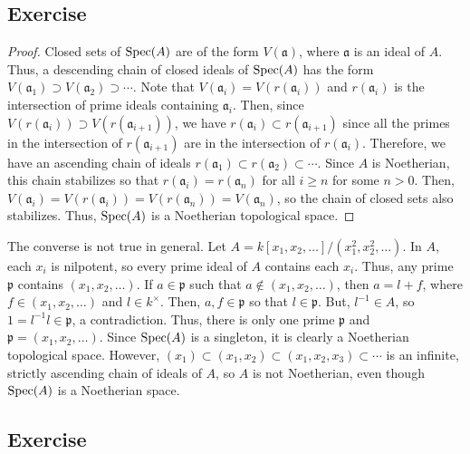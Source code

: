 \subsection{Exercise}\label{6.8}

\begin{proof}
Closed sets of $\operatorname{Spec}(A)$ are of the form $V(\mathfrak{a})$, where $\mathfrak{a}$ is an ideal of $A$. Thus, a descending chain of closed ideals of $\operatorname{Spec}(A)$
has the form $V(\mathfrak{a}_1) \supset V(\mathfrak{a}_2) \supset \cdots$. Note that $V(\mathfrak{a}_i) = V(r(\mathfrak{a}_i))$ and $r(\mathfrak{a}_i)$ is the
intersection of prime ideals containing $\mathfrak{a}_i$. Then, since $V(r(\mathfrak{a}_i)) \supset V(r(\mathfrak{a}_{i+1}))$, we have $r(\mathfrak{a}_i) \subset r(\mathfrak{a}_{i+1})$
since all the primes in the intersection of $r(\mathfrak{a}_{i+1})$ are in the intersection of $r(\mathfrak{a}_i)$. Therefore, we have an ascending chain
of ideals $r(\mathfrak{a}_1) \subset r(\mathfrak{a}_2) \subset \cdots$. Since $A$ is Noetherian, this chain stabilizes so that $r(\mathfrak{a}_i) = r(\mathfrak{a}_n)$
for all $i \ge n$ for some $n > 0$. Then, $V(\mathfrak{a}_i) = V(r(\mathfrak{a}_i)) = V(r(\mathfrak{a}_n)) = V(\mathfrak{a}_n)$, so the chain of closed sets also
stabilizes. Thus, $\operatorname{Spec}(A)$ is a Noetherian topological space.
\end{proof}

The converse is not true in general. Let $A = k[x_1,x_2,\ldots]/(x_1^2,x_2^2,\ldots)$. In $A$, each $x_i$ is nilpotent, so every prime ideal of $A$ contains each $x_i$.
Thus, any prime $\mathfrak{p}$ contains $(x_1,x_2,\ldots)$. If $a \in \mathfrak{p}$ such that $a \not\in (x_1,x_2,\ldots)$, then $a = l + f$, where $f \in (x_1,x_2,\ldots)$ 
and $l \in k^{\times}$. Then, $a,f \in \mathfrak{p}$ so that $l \in \mathfrak{p}$. But, $l^{-1} \in A$, so $1 = l^{-1}l \in \mathfrak{p}$, a contradiction. Thus,
there is only one prime $\mathfrak{p}$ and $\mathfrak{p} = (x_1,x_2,\ldots)$. Since $\operatorname{Spec}(A)$ is a singleton, it is clearly a Noetherian topological space.
However, $(x_1) \subset (x_1,x_2) \subset (x_1,x_2,x_3) \subset \cdots$ is an infinite, strictly ascending chain of ideals of $A$, so $A$ is not Noetherian,
even though $\operatorname{Spec}(A)$ is a Noetherian space.

\subsection{Exercise}\label{6.9}

